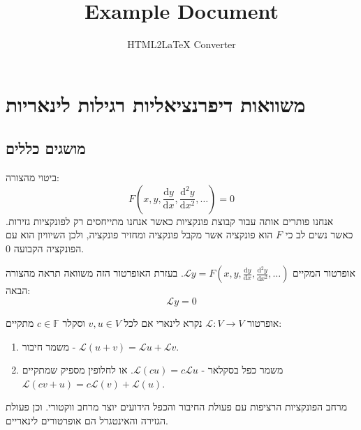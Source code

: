 \documentclass{tstextbook}
\begin{document}
\title{Example Document}
\author{HTML2LaTeX Converter}
\maketitle

\chapter{משוואות דיפרנציאליות רגילות לינאריות}

\section{מושגים כללים}

\begin{definition}
ביטוי מהצורה:
$$F\left( x,y,\frac{\mathrm{d} y}{\mathrm{d} x} ,\frac{\mathrm{d} ^2y}{\mathrm{d} x^{2}},\dots  \right)=0$$
אנחנו פותרים אותה עבור קבוצת פונקציות כאשר אנחנו מתייחסים רק לפונקציות גזירות. כאשר נשים לב כי \(F\) הוא פונקציה אשר מקבל פונקציה ומחזיר פונקציה, ולכן השיוויון הוא עם הפונקציה הקבועה 0.

\end{definition}
\begin{definition}
אופרטור המקיים \(\mathcal{L}y=F\left( x,y,\frac{\mathrm{d} y}{\mathrm{d} x} ,\frac{\mathrm{d} ^2y}{\mathrm{d} x^{2}},\dots  \right)\). בעזרת האופרטור הזה משוואה תראה מהצורה הבאה:
$$\mathcal{L}y=0$$

\end{definition}
\begin{reminder}
אופרטור \(\mathcal{L}:V\to V\) נקרא לינארי אם לכל \(v,u \in V\) וסקלר \(c \in \mathbb{F}\) מתקיים:

  \begin{enumerate}
    \item משמר חיבור - \(\mathcal{L}(u+v)=\mathcal{L}u+\mathcal{L}v\). 


    \item משמר כפל בסקלאר - \(\mathcal{L}(cu)=c\mathcal{L}u\). 
או לחלופין מספיק שמתקיים \(\mathcal{L}(cv+u)=c\mathcal{L}(v)+\mathcal{L}(u)\).


  \end{enumerate}
\end{reminder}
\begin{reminder}
מרחב הפונקציות הרציפות עם פעולת החיבור והכפל הידועים יוצר מרחב ווקטורי. וכן פעולת הגזירה והאינטגרל הם אופרטורים לינאריים.

\end{reminder}
\end{document}

